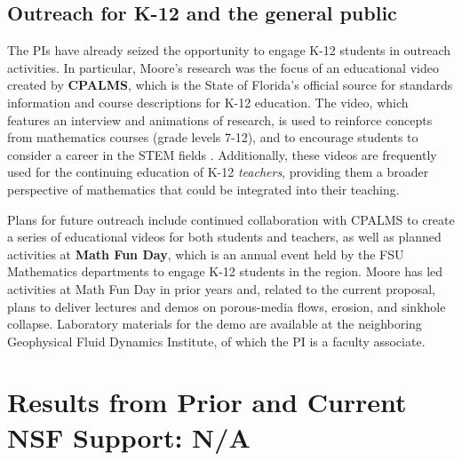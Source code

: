 \documentclass[11pt]{article}
\begin{document}
\subsection{Outreach for K-12 and the general public}

The PIs have already seized the opportunity to engage K-12 students in outreach activities. In particular, Moore's research was the focus of an educational video created by {\bf CPALMS}, which is the State of Florida's official source for standards information and course descriptions for K-12 education. The video, which features an interview and animations of research, is used to reinforce concepts from mathematics courses (grade levels 7-12), and to encourage students to consider a career in the STEM fields \cite{CPALMS}. Additionally, these videos are frequently used for the continuing education of K-12 {\em teachers}, providing them a broader perspective of mathematics that could be integrated into their teaching.
 
Plans for future outreach include continued collaboration with CPALMS to create a series of educational videos for both students and teachers, as well as planned activities at {\bf Math Fun Day}, which is an annual event held by the FSU Mathematics departments to engage K-12 students in the region. Moore has led activities at Math Fun Day in prior years and, related to the current proposal, plans to deliver lectures and demos on porous-media flows, erosion, and sinkhole collapse.
Laboratory materials for the demo are available at the neighboring Geophysical Fluid Dynamics Institute, of which the PI is a faculty associate.

\section{Results from Prior and Current NSF Support: N/A}


\newpage
\setcounter{page}{1}

%

\end{document}
